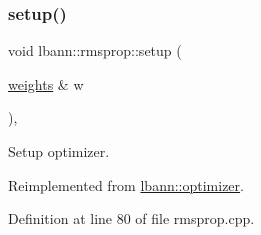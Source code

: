 \subsubsection{\texorpdfstring{setup()}{setup()}}
{\footnotesize\ttfamily void lbann\+::rmsprop\+::setup (\begin{DoxyParamCaption}\item[{\hyperlink{classlbann_1_1weights}{weights} \&}]{w }\end{DoxyParamCaption})\hspace{0.3cm}{\ttfamily [override]}, {\ttfamily [virtual]}}

Setup optimizer. 

Reimplemented from \hyperlink{classlbann_1_1optimizer_a7641a88b3c166df2d974a298622b992b}{lbann\+::optimizer}.



Definition at line 80 of file rmsprop.\+cpp.


